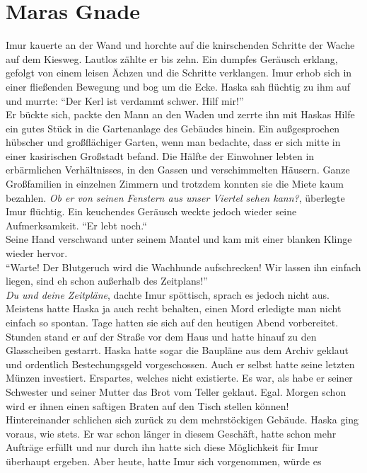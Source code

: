 \chapter{Maras Gnade}

Imur kauerte an der Wand und horchte auf die knirschenden Schritte der Wache auf dem Kiesweg. 
Lautlos zählte er bis zehn. Ein dumpfes Geräusch erklang, gefolgt von einem leisen Ächzen und die 
Schritte verklangen. Imur erhob sich in einer fließenden Bewegung und bog um die Ecke. Haska 
sah flüchtig zu ihm auf und murrte: ``Der Kerl ist verdammt schwer. Hilf mir!''\\
Er bückte sich, packte den Mann an den Waden und zerrte ihn mit Haskas Hilfe ein gutes Stück in 
die Gartenanlage des Gebäudes hinein. Ein außgesprochen hübscher und großflächiger Garten, wenn man 
bedachte, dass er sich mitte in einer kasirischen Großstadt befand. Die Hälfte der Einwohner lebten 
in erbärmlichen Verhältnisses, in den Gassen und verschimmelten Häusern. Ganze Großfamilien in 
einzelnen Zimmern und trotzdem konnten sie die Miete kaum bezahlen. \textit{Ob er von seinen 
Fenstern aus unser Viertel sehen kann?}, überlegte Imur flüchtig. Ein keuchendes Geräusch weckte 
jedoch wieder seine Aufmerksamkeit. ``Er lebt noch.``\\
Seine Hand verschwand unter seinem Mantel und kam mit einer blanken Klinge wieder hervor.\\
``Warte! Der Blutgeruch wird die Wachhunde aufschrecken! Wir lassen ihn einfach liegen, sind eh 
schon außerhalb des Zeitplans!''\\
\textit{Du und deine Zeitpläne}, dachte Imur spöttisch, sprach es jedoch nicht aus. Meistens hatte 
Haska ja auch recht behalten, einen Mord erledigte man nicht einfach so spontan. Tage hatten sie 
sich auf den heutigen Abend vorbereitet. Stunden stand er auf der Straße vor dem Haus und hatte 
hinauf zu den Glasscheiben gestarrt. Haska hatte sogar die Baupläne aus dem Archiv geklaut und 
ordentlich Bestechungsgeld vorgeschossen. Auch er selbst hatte seine letzten Münzen investiert. 
Erspartes, welches nicht existierte. Es war, als habe er seiner Schwester und seiner Mutter das 
Brot vom Teller geklaut. Egal. Morgen schon wird er ihnen einen saftigen Braten auf den Tisch 
stellen können!\\
Hintereinander schlichen sich zurück zu dem mehrstöckigen Gebäude. Haska ging voraus, wie stets. Er 
war schon länger in diesem Geschäft, hatte schon mehr Aufträge erfüllt und nur durch ihn hatte sich 
diese Möglichkeit für Imur überhaupt ergeben. Aber heute, hatte Imur sich vorgenommen, würde es 
